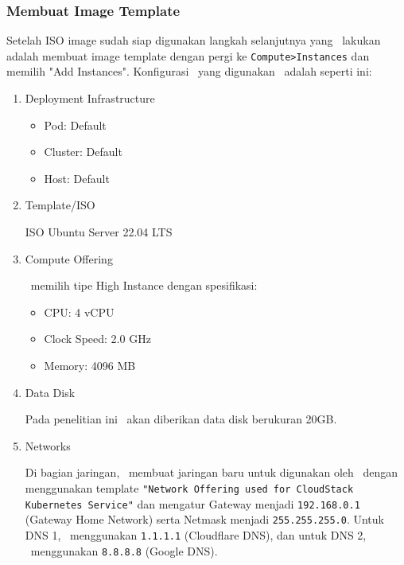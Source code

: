 \subsubsection{Membuat Image Template}
Setelah ISO image sudah siap digunakan langkah selanjutnya yang \saya\ lakukan adalah membuat image template dengan pergi ke \texttt{Compute>Instances} dan memilih "Add Instances". Konfigurasi \vm\ yang digunakan \saya\ adalah seperti ini:

\begin{enumerate}
    \item Deployment Infrastructure
          \begin{itemize}
              \item Pod: Default
              \item Cluster: Default
              \item Host: Default
          \end{itemize}

    \item Template/ISO

          ISO Ubuntu Server 22.04 LTS

    \item Compute Offering

          \saya\ memilih tipe High Instance dengan spesifikasi:
          \begin{itemize}
              \item CPU: 4 vCPU
              \item Clock Speed: 2.0 GHz
              \item Memory: 4096 MB
          \end{itemize}

    \item Data Disk

          Pada penelitian ini \vm\ akan diberikan data disk berukuran 20GB.

    \item Networks

          Di bagian jaringan, \saya\ membuat jaringan baru untuk digunakan oleh \vm\ dengan menggunakan template \texttt{"Network Offering used for CloudStack Kubernetes Service"} dan mengatur Gateway menjadi \texttt{192.168.0.1} (Gateway Home Network) serta Netmask menjadi \texttt{255.255.255.0}. Untuk DNS 1, \saya\ menggunakan \texttt{1.1.1.1} (Cloudflare DNS), dan untuk DNS 2, \saya\ menggunakan \texttt{8.8.8.8} (Google DNS).
\end{enumerate}


